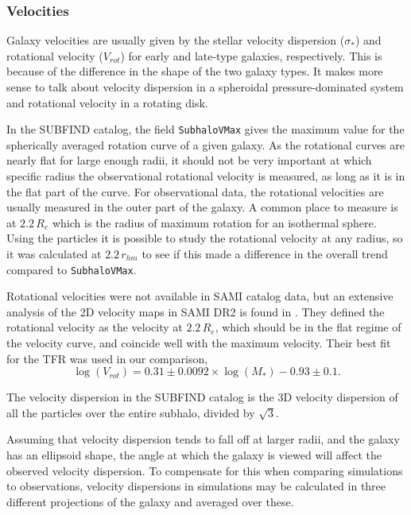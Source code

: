 \subsubsection{Velocities}

Galaxy velocities are usually given by the stellar velocity dispersion ($\sigma_*$) and rotational velocity ($V_{rot}$) for early and late-type galaxies, respectively. This is because of the difference in the shape of the two galaxy types. It makes more sense to talk about velocity dispersion in a spheroidal pressure-dominated system and rotational velocity in a rotating disk.

In the SUBFIND catalog, the field \texttt{SubhaloVMax} gives the maximum value for the spherically averaged rotation curve of a given galaxy. As the rotational curves are nearly flat for large enough radii, it should not be very important at which specific radius the observational rotational velocity is measured, as long as it is in the flat part of the curve. For observational data, the rotational velocities are usually measured in the outer part of the galaxy. A common place to measure is at $2.2\, R_e$ which is the radius of maximum rotation for an isothermal sphere. Using the particles it is possible to study the rotational velocity at any radius, so it was calculated at $2.2\, r_{hm}$ to see if this made a difference in the overall trend compared to \texttt{SubhaloVMax}. 

Rotational velocities were not available in SAMI catalog data, but an extensive analysis of the 2D velocity maps in SAMI DR2 is found in \textcite{Bloom2017}. They defined the rotational velocity as the velocity at $2.2\, R_e$, which should be in the flat regime of the velocity curve, and coincide well with the maximum velocity. Their best fit for the TFR was used in our comparison, 
\begin{equation}
	\log(V_{rot}) = 0.31 \pm 0.0092 \times \log(M_*)-0.93 \pm 0.1.
\end{equation}

The velocity dispersion in the SUBFIND catalog is the 3D velocity dispersion of all the particles over the entire subhalo, divided by $\sqrt{3}$. %

Assuming that velocity dispersion tends to fall off at larger radii, and the galaxy has an ellipsoid shape, the angle at which the galaxy is viewed will affect the observed velocity dispersion. To compensate for this when comparing simulations to observations, velocity dispersions in simulations may be calculated in three different projections of the galaxy and averaged over these. 

